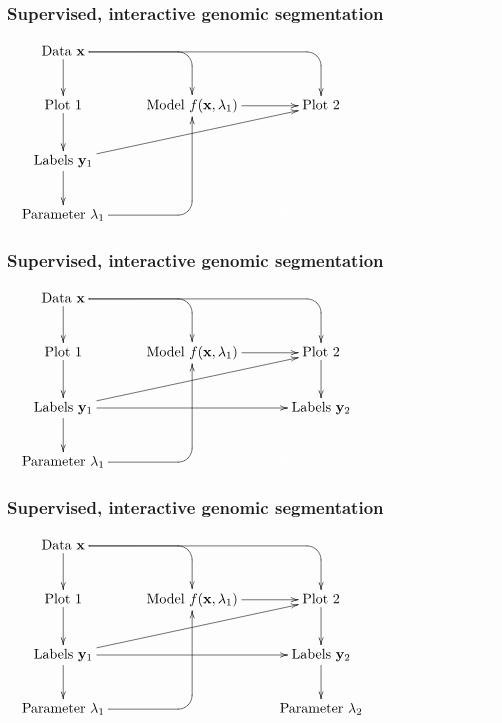 \documentclass{beamer}
\begin{document}
\begin{frame}
  \frametitle{Supervised, interactive genomic segmentation}
  \small
  \begin{displaymath}
  \xymatrix{
    \text{Data $\mathbf x$}
    \ar `[r] [dr] 
    \ar `r[rr] [drr] 
    \ar [d]
    & \text{ }
    & \text{ }
    & \text{ }
    \\
    \text{Plot 1} 
    \ar [d]
    & 
    \text{Model $f(\mathbf x, \lambda_1)$} 
    \ar [r]
    &
    \text{Plot 2} 
    & 
    \color{white}{\text{Model $f(\mathbf x, \lambda_2)$} }
    \\
    \text{Labels $\mathbf y_1$}       
    \ar [d]
    \ar [rru]
    &
    &
    \color{white}{\text{Labels $\mathbf y_2$}}
    \\
    \text{Parameter $\lambda_1$} 
    \ar `r[ruu] [ruu]
    & \text{ }
    & 
    \color{white}{\text{Parameter $\lambda_2$}}
  }
  \end{displaymath}
\end{frame}

\begin{frame}
  \frametitle{Supervised, interactive genomic segmentation}
  \small
  \begin{displaymath}
  \xymatrix{
    \text{Data $\mathbf x$}
    \ar `[r] [dr] 
    \ar `r[rr] [drr] 
    \ar [d]
    & \text{ }
    & \text{ }
    & \text{ }
    \\
    \text{Plot 1} 
    \ar [d]
    & 
    \text{Model $f(\mathbf x, \lambda_1)$} 
    \ar [r]
    &
    \text{Plot 2} 
    \ar [d]
    & 
    \color{white}{\text{Model $f(\mathbf x, \lambda_2)$} }
    \\
    \text{Labels $\mathbf y_1$}       
    \ar [d]
    \ar [rr]
    \ar [rru]
    &
    &
    \text{Labels $\mathbf y_2$}
    \\
    \text{Parameter $\lambda_1$} 
    \ar `r[ruu] [ruu]
    & \text{ }
    & 
    \color{white}{\text{Parameter $\lambda_2$}}
  }
  \end{displaymath}
\end{frame}

\begin{frame}
  \frametitle{Supervised, interactive genomic segmentation}
  \small
  \begin{displaymath}
  \xymatrix{
    \text{Data $\mathbf x$}
    \ar `[r] [dr] 
    \ar `r[rr] [drr] 
    \ar [d]
    & \text{ }
    & \text{ }
    & \text{ }
    \\
    \text{Plot 1} 
    \ar [d]
    & 
    \text{Model $f(\mathbf x, \lambda_1)$} 
    \ar [r]
    &
    \text{Plot 2} 
    \ar [d]
    & 
    \color{white}{\text{Model $f(\mathbf x, \lambda_2)$} }
    \\
    \text{Labels $\mathbf y_1$}       
    \ar [d]
    \ar [rr]
    \ar [rru]
    &
    &
    \text{Labels $\mathbf y_2$}
    \ar [d]
    \\
    \text{Parameter $\lambda_1$} 
    \ar `r[ruu] [ruu]
    & \text{ }
    & \text{Parameter $\lambda_2$}
  }
  \end{displaymath}
\end{frame}
\end{document}
